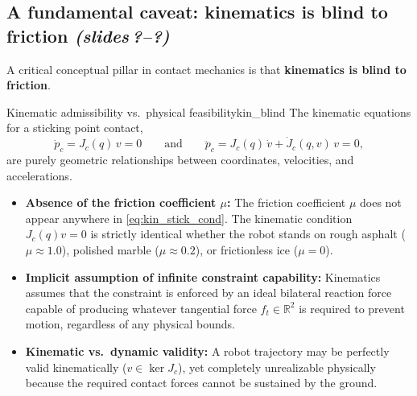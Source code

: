 \documentclass[11pt,a4paper]{article}
\newcommand{\R}{\mathbb{R}}
\newcommand{\sr}{\emph{(slides\,?--?)}}
\begin{document}
\subsection{A fundamental caveat: kinematics is blind to friction \sr}

A critical conceptual pillar in contact mechanics is that \textbf{kinematics is blind to friction}.

\begin{proposition}{Kinematic admissibility vs.\ physical feasibility}{kin_blind}
The kinematic equations for a sticking point contact,
\begin{equation}\label{eq:kin_stick_cond}
  \dot p_c = J_c(q)\,v = 0 \qquad \text{and} \qquad \ddot p_c = J_c(q)\,\dot v + \dot J_c(q,v)\,v = 0,
\end{equation}
are purely geometric relationships between coordinates, velocities, and accelerations.
\begin{itemize}[nosep]
  \item \textbf{Absence of the friction coefficient $\mu$:} The friction coefficient $\mu$ does not appear anywhere in \eqref{eq:kin_stick_cond}. The kinematic condition $J_c(q)v=0$ is strictly identical whether the robot stands on rough asphalt ($\mu \approx 1.0$), polished marble ($\mu \approx 0.2$), or frictionless ice ($\mu = 0$).
  \item \textbf{Implicit assumption of infinite constraint capability:} Kinematics assumes that the constraint is enforced by an ideal bilateral reaction force capable of producing whatever tangential force $f_t \in \R^2$ is required to prevent motion, regardless of any physical bounds.
  \item \textbf{Kinematic vs.\ dynamic validity:} A robot trajectory may be perfectly valid kinematically ($v \in \ker J_c$), yet completely unrealizable physically because the required contact forces cannot be sustained by the ground.
\end{itemize}
\end{proposition}
\end{document}

